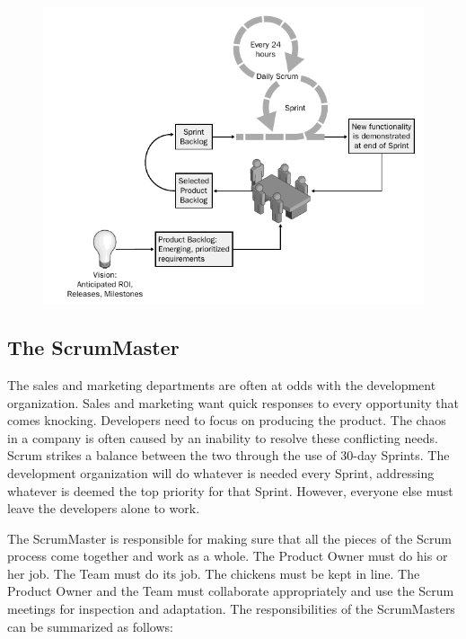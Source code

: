 \begin{figure}[H]
    \centering
    \includegraphics[scale=0.6]{images/2021-09-30_scrum_02.png}
\end{figure}


\subsection{The ScrumMaster}

The sales and marketing departments are often at odds with the development organization. Sales and marketing want quick responses to every opportunity that comes knocking. Developers need to focus on producing the product. The chaos in a company is often caused by an inability to resolve these conflicting needs. Scrum strikes a balance between the two through the use of 30-day Sprints. The development organization will do whatever is needed every Sprint, addressing whatever is deemed the top priority for that Sprint. However, everyone else must leave the developers alone to work.

The ScrumMaster is responsible for making sure that all the pieces of the Scrum process come together and work as a whole. The Product Owner must do his or her job. The Team must do its job. The chickens must be kept in line. The Product Owner and the Team must collaborate appropriately and use the Scrum meetings for inspection and adaptation. The responsibilities of the ScrumMasters can be summarized as follows:

